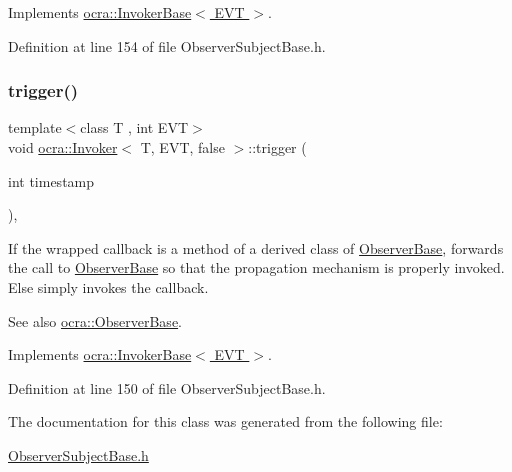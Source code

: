 Implements \hyperlink{classocra_1_1InvokerBase_a90d81926209cb3119933412f742bc245}{ocra\+::\+Invoker\+Base$<$ E\+V\+T $>$}.



Definition at line 154 of file Observer\+Subject\+Base.\+h.

\hypertarget{classocra_1_1Invoker_3_01T_00_01EVT_00_01false_01_4_a740261f9f9c3278c9668d192eae56c2a}{}\label{classocra_1_1Invoker_3_01T_00_01EVT_00_01false_01_4_a740261f9f9c3278c9668d192eae56c2a} 
\subsubsection{\texorpdfstring{trigger()}{trigger()}}
{\footnotesize\ttfamily template$<$class T , int E\+VT$>$ \\
void \hyperlink{classocra_1_1Invoker}{ocra\+::\+Invoker}$<$ T, E\+VT, false $>$\+::trigger (\begin{DoxyParamCaption}\item[{int}]{timestamp }\end{DoxyParamCaption})\hspace{0.3cm}{\ttfamily [inline]}, {\ttfamily [virtual]}}

If the wrapped callback is a method of a derived class of \hyperlink{classocra_1_1ObserverBase}{Observer\+Base}, forwards the call to \hyperlink{classocra_1_1ObserverBase}{Observer\+Base} so that the propagation mechanism is properly invoked. Else simply invokes the callback. \begin{DoxySeeAlso}{See also}
\hyperlink{classocra_1_1ObserverBase}{ocra\+::\+Observer\+Base}. 
\end{DoxySeeAlso}


Implements \hyperlink{classocra_1_1InvokerBase_ae4d7537a1b2c0aa9b5188c5da8423289}{ocra\+::\+Invoker\+Base$<$ E\+V\+T $>$}.



Definition at line 150 of file Observer\+Subject\+Base.\+h.



The documentation for this class was generated from the following file\+:\begin{DoxyCompactItemize}
\item 
\hyperlink{ObserverSubjectBase_8h}{Observer\+Subject\+Base.\+h}\end{DoxyCompactItemize}

